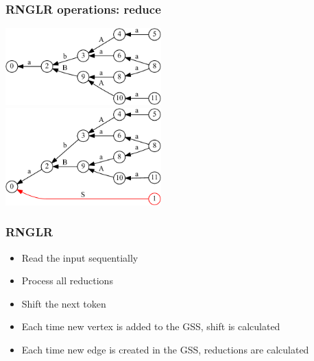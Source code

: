 \documentclass{beamer}
\begin{document}
\begin{frame}
  \transwipe[direction=90]
  \frametitle{RNGLR operations: reduce}
  \begin{center}
  \includegraphics[width=6cm]{pictures/gss_rnglr_reduce_1} \\  \vspace{10pt}
  \pause
  \includegraphics[width=6cm]{pictures/gss_rnglr_reduce_2}
  \end{center}
\end{frame}

\begin{frame}
  \transwipe[direction=90]
  \frametitle{RNGLR}
  \begin{itemize}
    \item Read the input sequentially
  \end{itemize}
  \begin{itemize}
    \item Process all reductions
    \item Shift the next token
  \end{itemize}
  \begin{itemize}
    \item Each time new vertex is added to the GSS, shift is calculated
    \item Each time new edge is created in the GSS, reductions are calculated
  \end{itemize}
\end{frame}
\end{document}
